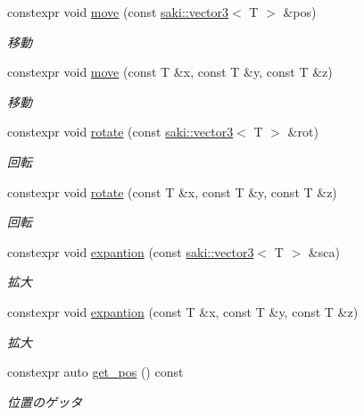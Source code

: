 \begin{DoxyCompactItemize}
\item 
constexpr void \mbox{\hyperlink{classsaki_1_1_transform_a5c323904a1862b33a19951d198926c06}{move}} (const \mbox{\hyperlink{classsaki_1_1vector3}{saki\+::vector3}}$<$ T $>$ \&pos)
\begin{DoxyCompactList}\small\item\em 移動 \end{DoxyCompactList}\item 
constexpr void \mbox{\hyperlink{classsaki_1_1_transform_a4224288f8beb594246a2e7d58c7ba478}{move}} (const T \&x, const T \&y, const T \&z)
\begin{DoxyCompactList}\small\item\em 移動 \end{DoxyCompactList}\item 
constexpr void \mbox{\hyperlink{classsaki_1_1_transform_a596353b58da1c694813ad31d1ea2bc06}{rotate}} (const \mbox{\hyperlink{classsaki_1_1vector3}{saki\+::vector3}}$<$ T $>$ \&rot)
\begin{DoxyCompactList}\small\item\em 回転 \end{DoxyCompactList}\item 
constexpr void \mbox{\hyperlink{classsaki_1_1_transform_a9ee0019cf9fb42b2710f2ecea64ed977}{rotate}} (const T \&x, const T \&y, const T \&z)
\begin{DoxyCompactList}\small\item\em 回転 \end{DoxyCompactList}\item 
constexpr void \mbox{\hyperlink{classsaki_1_1_transform_a8327df1cfe852938414010ead1806ce5}{expantion}} (const \mbox{\hyperlink{classsaki_1_1vector3}{saki\+::vector3}}$<$ T $>$ \&sca)
\begin{DoxyCompactList}\small\item\em 拡大 \end{DoxyCompactList}\item 
constexpr void \mbox{\hyperlink{classsaki_1_1_transform_a33696821bc9d53d221aaeb6927fe6f64}{expantion}} (const T \&x, const T \&y, const T \&z)
\begin{DoxyCompactList}\small\item\em 拡大 \end{DoxyCompactList}\item 
constexpr auto \mbox{\hyperlink{classsaki_1_1_transform_a75bbd7f2033595079c51d629f06e5624}{get\+\_\+pos}} () const
\begin{DoxyCompactList}\small\item\em 位置のゲッタ \end{DoxyCompactList}\item 

\end{DoxyCompactItemize}
